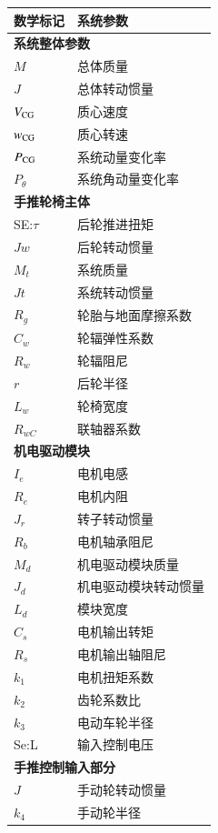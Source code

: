 \begin{table}[H]
\footnotesize
\caption{系统主要参数及其数学标记}\label{tab:param}
\begin{longtable}{l|l}
	\toprule
	\textbf{数学标记} & \textbf{系统参数}\\
	\midrule
	\endhead
	\multicolumn{2}{l}{\textbf{系统整体参数}} \\ %
	\midrule
	$ M $ & 总体质量\\
	$ J $ & 总体转动惯量\\
	$ V_{\rm{CG}} $ & 质心速度\\
	$ w_{\rm{CG}} $ & 质心转速\\
	$ P_{\rm{CG}} $ & 系统动量变化率\\
	$ P_{\theta} $ & 系统角动量变化率\\
	\midrule
	\multicolumn{2}{l}{\textbf{手推轮椅主体}} \\
	\midrule
	SE:$\tau$ & 后轮推进扭矩 \\
	$ J w $ & 后轮转动惯量\\
	$ M_t $ & 系统质量\\
	$ J t $ & 系统转动惯量\\
	$ R_g $ & 轮胎与地面摩擦系数\\
	$ C_w $ & 轮辐弹性系数\\
	$ R_w $ & 轮辐阻尼\\
	$ r $ & 后轮半径\\
	$ L_w $ & 轮椅宽度\\
	$ R_{wC} $ & 联轴器系数\\
	\midrule
	\multicolumn{2}{l}{\textbf{机电驱动模块}} \\
	\midrule
	$ I_e $ & 电机电感\\
	$ R_e $ & 电机内阻\\
	$ J_r $ & 转子转动惯量\\
	$ R_b $ & 电机轴承阻尼\\
	$ M_d $ & 机电驱动模块质量\\
	$ J_d $ & 机电驱动模块转动惯量\\
	$ L_d $ & 模块宽度\\
	$ C_s $ & 电机输出转矩\\
	$ R_s $ & 电机输出轴阻尼\\
	$ k_1 $ & 电机扭矩系数\\ %
	$ k_2 $ & 齿轮系数比\\ %
	$ k_3 $ & 电动车轮半径 \\ %
	Se:L & 输入控制电压\\
	\midrule
	\multicolumn{2}{l}{\textbf{手推控制输入部分}}\\
	\midrule
	$ J $ & 手动轮转动惯量\\
	$ k_4 $ & 手动轮半径\\ %
	\bottomrule
\end{longtable}
\end{table}